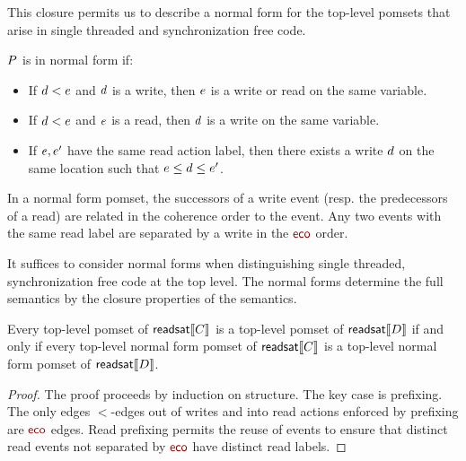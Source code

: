 This closure permits us to  describe a normal form for the top-level pomsets that arise in single threaded and synchronization free code.  
\begin{definition}
$P$ is in normal form if:
\begin{itemize}
\item If $d < e$ and  $d$ is a write, then $e$ is a write or read on the same variable.
\item If $d < e$ and  $e$ is a read, then $d$ is a write on the same variable. 
    
\item If $e, e'$ have the same read action label, then there exists a write $d$ on the same location such that $e \leq d \leq e'$.
\end{itemize}
\end{definition}
In a normal form pomset, the successors of a write event (resp. the predecessors of a read) are related in the coherence order to the event.  Any two events with the same read label are separated by a write in the $\reco$ order. 

It suffices to consider normal forms when distinguishing single threaded, synchronization free code at the top level.  The normal forms determine the full semantics by the closure properties of the semantics.

\begin{lemma}\label{unrhd}
Every top-level pomset of $\mathsf{readsat}\llbracket C\rrbracket$ is a top-level pomset of $\mathsf{readsat}\llbracket D\rrbracket$ if and only if 
every top-level normal form pomset of $\mathsf{readsat}\llbracket C\rrbracket$ is a top-level normal form pomset of $\mathsf{readsat}\llbracket D\rrbracket$.
\begin{proof}
The proof proceeds by induction on structure.  The key case is prefixing.  The only edges $\lt$-edges out of writes  and into read actions enforced by prefixing are $\reco$ edges.  Read prefixing permits the reuse of events to ensure that distinct read events not separated by $\reco$ have distinct read labels.  
\end{proof}
\end{lemma}

